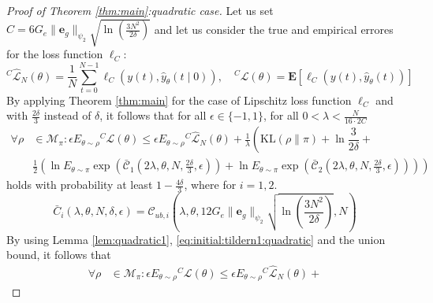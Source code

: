 \documentclass{article}
\newcommand{\KL}{\mathrm{KL}}
\renewcommand{\KL}{\mathrm{KL}}
\newcommand{\e}{\mathbf{e}}
\newcommand{\bE}{\mathbf{E}}
\begin{document}
\begin{proof}[Proof of Theorem \ref{thm:main}:quadratic case]
      Let us set $C=6G_e\|\e_g\|_{\psi_2}\sqrt{\ln(\frac{3N^2}{2\delta})}$ and let us consider the 
      true and empirical errores for the loss function $\ell_C$:
      \begin{equation}
        \label{eq:initial:tildern1:quadratic0} 
         {}^C\hat{\mathcal{L}}_{N}(\theta) = \frac{1}{N} \sum_{t=0}^{N-1} \ell_C(y(t), \hat{y}_{\theta}(t \mid 0)), \quad 
         {}^C \mathcal{L}(\theta) = \bE[\ell_C(y(t), \hat{y}_{\theta}(t))]
      \end{equation}
      By applying Theorem \ref{thm:main} for the case of Lipschitz loss function $\ell_C$  and
      with $\frac{2\delta}{3}$ instead of $\delta$, it follows
      that for all $\epsilon \in \{-1,1\}$,
      for all $0 < \lambda  < \frac{N}{16 \cdot 2C}$
        \begin{equation}
        \label{eq:initial:tildern1:quadratic} 
    \begin{aligned}
         \forall \rho & \in \mathcal{M}_\pi: \epsilon E_{\theta\sim\rho} {}^C\mathcal{L}(\theta)
         \leq   \epsilon E_{\theta\sim\rho}{}^C\hat{\mathcal{L}}_N(\theta) +  
          \frac{1}{\lambda}\left ( \KL(\rho\|\pi) + \ln\dfrac{3}{2\delta} + \right. \\
          &  \left. \frac{1}{2} 
          \left(\ln E_{\theta\sim\pi} \exp(\mathcal{\bar{C}}_1(2\lambda,\theta,N,\frac{2\delta}{3},\epsilon))+
          \ln E_{\theta \sim \pi} \exp(\mathcal{\bar{C}}_2(2\lambda,\theta,N,\frac{2\delta}{3},\epsilon))\right)
           \right )
    \end{aligned}
    \end{equation}
    holds with probability at least $1-\frac{4\delta}{3}$, where  for $i=1,2$.
    \begin{equation}
    \label{thm:main:quadratic:eq2}
       \bar{C}_i(\lambda,\theta,N,\delta,\epsilon)= 
       \mathcal{C}_{ub,i}(\lambda,\theta,12G_e\|\e_g\|_{\psi_2}\sqrt{\ln\left(\frac{3N^2}{2\delta}\right)},N)
    \end{equation}
    By using Lemma \ref{lem:quadratic1}, \eqref{eq:initial:tildern1:quadratic}
    and the union bound, it follows that 
   \begin{equation}
        \label{eq:initial:tildern1:quadratic22} 
    \begin{aligned}
         \forall \rho & \in \mathcal{M}_\pi: \epsilon E_{\theta\sim\rho} {}^C\mathcal{L}(\theta)
         \leq   \epsilon E_{\theta\sim\rho}{}^C\hat{\mathcal{L}}_N(\theta) +  

\end{aligned}
\end{equation}
\end{proof}
\end{document}
